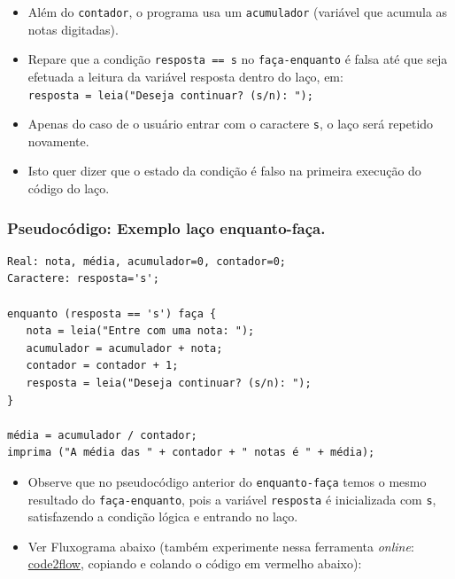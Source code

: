 \documentclass[12pt,a4paper]{article}
\providecommand{\tightlist}{%
      \setlength{\itemsep}{0pt}\setlength{\parskip}{0pt}}
\begin{document}
    \begin{itemize}
\item
  Além do \texttt{contador}, o programa usa um \texttt{acumulador}
  (variável que acumula as notas digitadas).
\item
  Repare que a condição
  \texttt{resposta\ ==\ \textquotesingle{}s\textquotesingle{}} no
  \texttt{faça-enquanto} é falsa até que seja efetuada a leitura da
  variável resposta dentro do laço, em:
  \texttt{resposta\ =\ leia("Deseja\ continuar?\ (s/n):\ ");}
\item
  Apenas do caso de o usuário entrar com o caractere
  \texttt{\textquotesingle{}s\textquotesingle{}}, o laço será repetido
  novamente.
\item
  Isto quer dizer que o estado da condição é falso na primeira execução
  do código do laço.
\end{itemize}

    \hypertarget{pseudocuxf3digo-exemplo-lauxe7o-enquanto-fauxe7a.}{%
\subsubsection{Pseudocódigo: Exemplo laço
enquanto-faça.}\label{pseudocuxf3digo-exemplo-lauxe7o-enquanto-fauxe7a.}}

\begin{verbatim}
Real: nota, média, acumulador=0, contador=0;
Caractere: resposta='s';

enquanto (resposta == 's') faça {
   nota = leia("Entre com uma nota: ");
   acumulador = acumulador + nota;
   contador = contador + 1;
   resposta = leia("Deseja continuar? (s/n): ");
} 

média = acumulador / contador;
imprima ("A média das " + contador + " notas é " + média);
\end{verbatim}

    \begin{itemize}
\tightlist
\item
  Observe que no pseudocódigo anterior do \texttt{enquanto-faça} temos o
  mesmo resultado do \texttt{faça-enquanto}, pois a variável
  \texttt{resposta} é inicializada com \texttt{s}, satisfazendo a
  condição lógica e entrando no laço.
\end{itemize}

    \begin{itemize}
\tightlist
\item
  Ver Fluxograma abaixo (também experimente nessa ferramenta
  \emph{online}: \href{https://app.code2flow.com/}{code2flow}, copiando
  e colando o código em vermelho abaixo):
\end{itemize}
\end{document}
